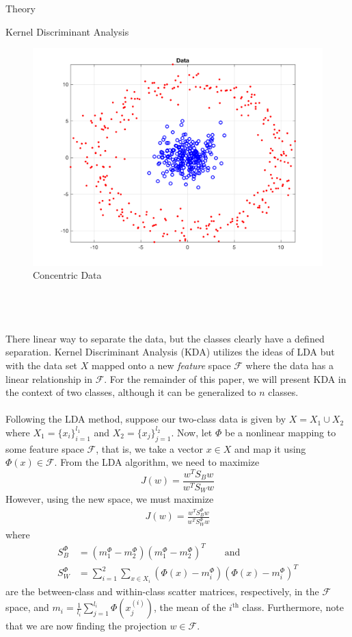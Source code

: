 \begin{section}{Theory}
\begin{subsection}{Kernel Discriminant Analysis}
\begin{minipage}{1.0\textwidth}
    \begin{figure}[H]
    \centering
    \includegraphics[trim={0cm 0cm 0cm 0cm},clip,width=0.8\columnwidth]{kda_test/circles_data}
    \caption{Concentric Data}
    \label{fig:circle_data}
    \end{figure}
\end{minipage}
\\
\\
\\
There linear way to separate the data, but the classes clearly have a defined separation. Kernel Discriminant Analysis (KDA) utilizes the ideas of LDA but with the data set $X$ mapped onto a new \textit{feature} space $\mathcal{F}$ where the data has a linear relationship in $\mathcal{F}$. For the remainder of this paper, we will present KDA in the context of two classes, although it can be generalized to $n$ classes.
\\
\\
Following the LDA method, suppose our two-class data is given by $X = X_1 \cup X_2$ where $X_1 = \lbrace x_i \rbrace_{i=1}^{l_1}$ and $X_2 = \lbrace x_j \rbrace_{j=1}^{l_2}$. Now, let $\Phi$ be a nonlinear mapping to some feature space $\mathcal{F}$, that is, we take a vector $x \in X$ and map it using $\Phi(x) \in \mathcal{F}$. From the LDA algorithm, we need to maximize
$$
	J(w) = \frac{w^T S_B w}{w^T S_W w}
$$
However, using the new space, we must maximize
\begin{align}
	J(w) = \frac{w^T S_B^\Phi w}{w^T S_W^\Phi w} \label{objFcn}
\end{align}
where 
\begin{align*}
	S_B^\Phi &= (m_1^\Phi - m_2^\Phi) (m_1^\Phi - m_2^\Phi)^T \qquad \text{and} \\
	S_W^\Phi &= \sum_{i=1}^2 \sum_{x \in X_i} (\Phi(x) - m_i^\Phi) (\Phi(x) - m_i^\Phi)^T
\end{align*}
are the between-class and within-class scatter matrices, respectively, in the $\mathcal{F}$ space, and $m_i = \frac{1}{l_i} \sum_{j=1}^{l_i} \Phi( x_j^{(i)} )$, the mean of the $i^{\text{th}}$ class. Furthermore, note that we are now finding the projection $w \in \mathcal{F}$.
\\
\\


\end{subsection}
\end{section}
